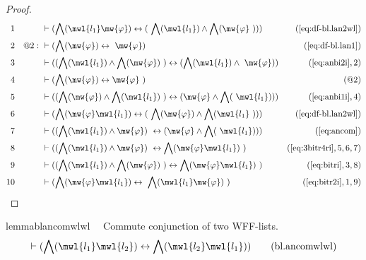 \begin{proof}
\begin{align}
  1 &&  & \vdash ( \bigwedge( \mwl{l_1} \mw{\varphi} ) \leftrightarrow (
     ~\bigwedge( \mwl{l_1} ) \wedge \bigwedge( \mw{\varphi}
     ~) ) )&(\mbox{\ref{eq:df-bl.lan2wl}})\notag
  \\ 2 && @2:\  & \vdash ( \bigwedge( \mw{\varphi} ) \leftrightarrow
     ~\mw{\varphi} )&(\mbox{\ref{eq:df-bl.lan1}})\notag
  \\ 3 &&  & \vdash ( ( \bigwedge( \mwl{l_1} ) \wedge \bigwedge( \mw{\varphi} )
     ~) \leftrightarrow ( \bigwedge( \mwl{l_1} ) \wedge
     ~\mw{\varphi} ) )&(\mbox{\ref{eq:anbi2i}},2)\notag
  \\ 4 &&  & \vdash ( \bigwedge( \mw{\varphi} ) \leftrightarrow \mw{\varphi}
     ~)&(@2)\notag
  \\ 5 &&  & \vdash ( ( \bigwedge( \mw{\varphi} ) \wedge \bigwedge( \mwl{l_1} )
     ~) \leftrightarrow ( \mw{\varphi} \wedge \bigwedge(
     ~\mwl{l_1} ) ) )&(\mbox{\ref{eq:anbi1i}},4)\notag
  \\ 6 &&  & \vdash ( \bigwedge( \mw{\varphi} \mwl{l_1} ) \leftrightarrow (
     ~\bigwedge( \mw{\varphi} ) \wedge \bigwedge( \mwl{l_1}
     ~) ) )&(\mbox{\ref{eq:df-bl.lan2wl}})\notag
  \\ 7 &&  & \vdash ( ( \bigwedge( \mwl{l_1} ) \wedge \mw{\varphi} )
     ~\leftrightarrow ( \mw{\varphi} \wedge \bigwedge(
     ~\mwl{l_1} ) ) )&(\mbox{\ref{eq:ancom}})\notag
  \\ 8 &&  & \vdash ( ( \bigwedge( \mwl{l_1} ) \wedge \mw{\varphi} )
     ~\leftrightarrow \bigwedge( \mw{\varphi} \mwl{l_1} )
     ~)&(\mbox{\ref{eq:3bitr4ri}},5,6,7)\notag
  \\ 9 &&  & \vdash ( ( \bigwedge( \mwl{l_1} ) \wedge \bigwedge( \mw{\varphi} )
     ~) \leftrightarrow \bigwedge( \mw{\varphi} \mwl{l_1} )
     ~)&(\mbox{\ref{eq:bitri}},3,8)\notag
  \\ 10 &&  & \vdash ( \bigwedge( \mw{\varphi} \mwl{l_1} ) \leftrightarrow
     ~\bigwedge( \mwl{l_1} \mw{\varphi} )
     ~)&(\mbox{\ref{eq:bitr2i}},1,9)\notag
\end{align}
\end{proof}

\begin{restatable}{lemma}{blancomwlwl}~~ Commute conjunction of two WFF-lists.
\begin{align}
\vdash ( \bigwedge( \mwl{l_1} \mwl{l_2} ) \leftrightarrow \bigwedge( \mwl{l_2}
    \mwl{l_1} ) )\label{eq:bl.ancomwlwl}\tag{bl.ancomwlwl}
\end{align}
\end{restatable}

